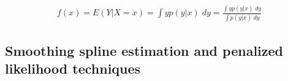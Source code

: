 \documentclass[12pt]{article}
\begin{document}
\begin{eqnarray}
f\left(x\right) = E\left(Y \vert X=x\right) = \int yp(y \vert x)\;dy = \frac{ \int yp(y \vert x)\;dy }{ \int p(y \vert x)\;dy }
\end{eqnarray}
 


\subsection{Smoothing spline estimation and penalized likelihood techniques}
\end{document}
